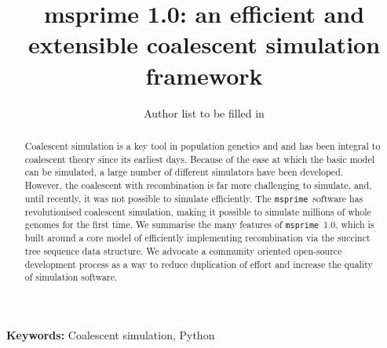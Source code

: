 \documentclass{article}
\newcommand{\msprime}[0]{\texttt{msprime}}
\begin{document}
\title{msprime 1.0: an efficient and extensible coalescent simulation framework}
\author{Author list to be filled in
}


\maketitle



\begin{abstract}
Coalescent simulation is a key tool in population genetics and
and has been integral to coalescent theory since its earliest days.
Because of the ease at which the basic model can be simulated,
a large number of different simulators have been developed. However,
the coalescent with recombination is far more challenging to simulate,
and, until recently, it was not possible to simulate efficiently.
The \msprime\ software has revolutionised
coalescent simulation, making it possible to simulate millions
of whole genomes for the first time. We summarise the many features
of \msprime\ 1.0, which is built around a core model of efficiently
implementing recombination via the succinct tree sequence data
structure. We advocate a community oriented open-source development
process as a way to reduce duplication of effort and increase
the quality of simulation software.
\end{abstract}

\textbf{Keywords:} Coalescent simulation, Python

\end{document}

